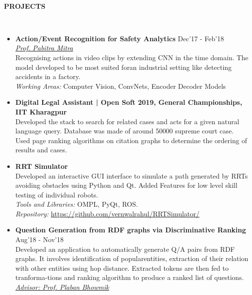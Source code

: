\documentclass[a4paper,8pt]{article}
\newcommand{\lsep}{-0.5cm}
\newcommand{\resheading}[1]{{\small \colorbox{mygrey}{\begin{minipage}{0.975\textwidth}{\textbf{#1 \vphantom{p\^{E}}}}\end{minipage}}}}
\begin{document}
\hspace{0.5cm}\\[-0.2cm]
\resheading{\textbf{PROJECTS} }\\[\lsep]
\begin{itemize}

\item \textbf{Action/Event Recognition for Safety Analytics} \hfill \small{Dec'17 - Feb'18} \\
\href{https://cse.iitkgp.ac.in/~pabitra/}{\textit{Prof. Pabitra Mitra}} \\
\small{Recognising actions in video clips by extending CNN in the time domain.  The model developed to be most suited foran industrial setting like detecting accidents in a factory.}\\
\textit{Working Areas:} \small{ Computer Vision, ConvNets, Encoder Decoder Models }

\item \textbf{Digital Legal Assistant | Open Soft 2019, General Championships, IIT Kharagpur} \\
\small{Developed the stack to search for related cases and acts for a given natural language query. Database was made of around 50000 supreme court case. Used
page ranking algorithms on citation graphs to determine the ordering of results and cases.}

\item \textbf{RRT Simulator} \\
\small{Developed an interactive GUI interface to simulate a path generated by RRTs avoiding obstacles using Python and Qt. Added Features for low level skill testing of individual robots.}\\
\textit{Tools and Libraries:} \small{OMPL, PyQt, ROS.}\\
\textit{Repository:} \href{https://github.com/vernwalrahul/RRTSimulator/}{\small{https://github.com/vernwalrahul/RRTSimulator/}}

\item \textbf{Question Generation from RDF graphs via Discriminative Ranking} \hfill \small{Aug'18 - Nov'18} \\
\small{Developed an application to automatically generate Q/A pairs from RDF graphs.  It involves identification of popularentities, extraction of their relation with other entities using hop distance.  Extracted tokens are then fed to tranforma-tions and ranking algorithm to produce a ranked list of questions.}\\
\href{http://www.iitkgp.ac.in/department/ET/faculty/et-plaban}{\textit{Advisor: Prof. Plaban Bhowmik}}


\end{itemize}
\end{document}
